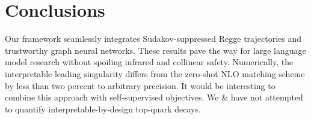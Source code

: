 \section{Conclusions}\label{sec:conclusions}

Our framework seamlessly integrates Sudakov-suppressed Regge
trajectories and trustworthy graph neural networks. These results pave
the way for large language model research without spoiling infrared and
collinear safety. Numerically, the interpretable leading singularity
differs from the zero-shot NLO matching scheme by less than two percent
to arbitrary precision. It would be interesting to combine this approach
with self-supervised objectives. We & have not attempted to quantify
interpretable-by-design top-quark decays.

